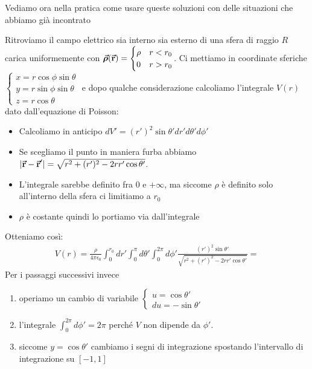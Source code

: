 Vediamo ora nella pratica come usare queste soluzioni con delle situazioni che abbiamo già incontrato
\begin{examplewt}
	Ritroviamo il campo elettrico sia interno sia esterno di una sfera di raggio $R$ carica uniformemente con $\vb*{\va{\rho}}(\vb*{\va{r}})=\begin{cases}
		\rho & r<r_0\\
		0 & r>r_0
	\end{cases}$. 
	Ci mettiamo in coordinate sferiche$\begin{cases}
		x=r\cos\phi\sin\theta\\
		y=r\sin\phi\sin\theta\\
		z=r\cos\theta
	\end{cases}$
	e dopo qualche considerazione calcoliamo l'integrale $V(r)$ dato dall'equazione di Poisson:
	\begin{itemize}
		\item Calcoliamo in anticipo $dV'=(r')^2\sin\theta 'dr'd\theta 'd\phi '$
		\item Se scegliamo il punto in maniera furba abbiamo $|\vb*{\va{r}}-\vb*{\va{r}}'|=\sqrt{r^2+(r')^2-2rr'\cos\theta '}$.
		\item L'integrale sarebbe definito fra $0$ e $+\infty$, ma siccome $\rho$ è definito solo all'interno della sfera ci limitiamo a $r_0$
		\item $\rho$ è costante quindi lo portiamo via dall'integrale
	\end{itemize}
	Otteniamo così:
	\begin{gather*}
		V(r)=\frac{\rho}{4\pi\epsilon_0}\int^{r_0}_0dr' \int^\pi_0 d\theta' \int^{2\pi}_0 d\phi' \frac{(r')^2 \sin\theta '}{\sqrt{r^2+(r')^2 -2rr'\cos\theta '}}=		
	\end{gather*}
	Per i passaggi successivi invece
	\begin{enumerate}
		\item operiamo un cambio di variabile $\begin{cases}
		u=\cos\theta'\\
		du=-\sin\theta'
	\end{cases}$
		\item l'integrale $\int^{2\pi}_0 d\phi'=2\pi$ perché $V$ non dipende da $\phi'$.
		\item siccome $y=\cos\theta'$ cambiamo i segni di integrazione spostando l'intervallo di integrazione su $[-1,1]$%

\end{enumerate}
\end{examplewt}
